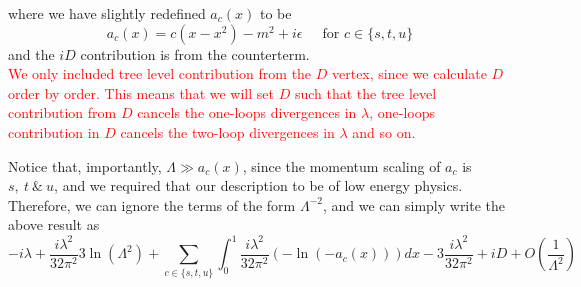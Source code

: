 \documentclass[11pt, notitlepage]{report}
\numberwithin{equation}{section}
\begin{document}
\begin{figure}[H]
    \centering
\end{figure}
where we have slightly redefined \(a_c(x)\) to be 
\begin{equation*}
    a_c(x) = c(x-x^2) - m^2 + i\epsilon ~~~~~\text{ for }c\in\{s,t,u\}
\end{equation*}
and the \(iD\) contribution is from the counterterm. \\
\textcolor{red}{We only included tree level contribution from the \(D\) vertex, since we calculate \(D\) order by order. This means that we will set \(D\) such that the tree level contribution from \(D\) cancels the one-loops divergences in \(\lambda\), one-loops contribution in \(D\) cancels the two-loop divergences in \(\lambda\) and so on.\\ }

Notice that, importantly, \(\Lambda \gg a_c(x)\), since the momentum scaling of \(a_c\) is \(s,~t~\& ~u\), and we required that our description to be of low energy physics. Therefore, we can ignore the terms of the form \(\Lambda^{-2}\), and we can simply write the above result as 
\begin{equation*}
    -i\lambda +  \frac{i\lambda^2 }{32\pi^2} 3\ln(\Lambda^2) +  \sum_{c\in\{s,t,u\}} \int_0^1  \frac{i\lambda^2 }{32\pi^2} \left( - \ln (-a_c(x)) \right)dx -  3\frac{i\lambda^2 }{32\pi^2}+ iD + O\left(\frac{1}{\Lambda^2}\right)
\end{equation*}
\end{document}
